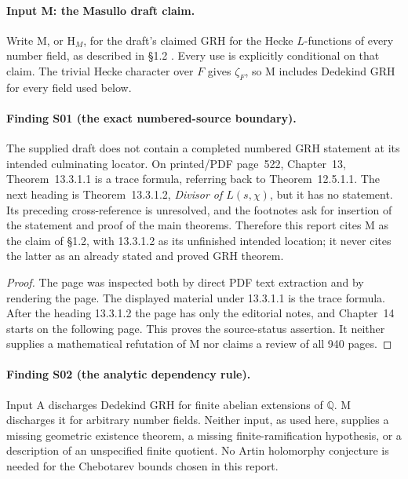 \documentclass[11pt,a4paper]{article}
\begin{document}
\paragraph{Input M: the Masullo draft claim.}
Write M, or $\mathrm H_M$, for the draft's claimed GRH for the Hecke
$L$-functions of every number field, as described in \S1.2
\cite{Masullo}. Every use is explicitly conditional on that claim.
The trivial Hecke character over $F$ gives $\zeta_F$, so M includes
Dedekind GRH for every field used below.

\paragraph{Finding S01 (the exact numbered-source boundary).}
The supplied draft does not contain a completed numbered GRH
statement at its intended culminating locator. On printed/PDF
page~522, Chapter~13, Theorem~13.3.1.1 is a trace formula, referring
back to Theorem~12.5.1.1. The next heading is
Theorem~13.3.1.2, \emph{Divisor of $L(s,\chi)$}, but it has no
statement. Its preceding cross-reference is unresolved, and the
footnotes ask for insertion of the statement and proof of the main
theorems. Therefore this report cites M as the claim of \S1.2, with
13.3.1.2 as its unfinished intended location; it never cites the
latter as an already stated and proved GRH theorem.

\begin{proof}
The page was inspected both by direct PDF text extraction and by
rendering the page. The displayed material under 13.3.1.1 is the
trace formula. After the heading 13.3.1.2 the page has only the
editorial notes, and Chapter~14 starts on the following page.
This proves the source-status assertion. It neither supplies a
mathematical refutation of M nor claims a review of all 940 pages.
\end{proof}

\paragraph{Finding S02 (the analytic dependency rule).}
Input A discharges Dedekind GRH for finite abelian extensions of
$\mathbb Q$. M discharges it for arbitrary number fields. Neither
input, as used here, supplies a missing geometric existence theorem,
a missing finite-ramification hypothesis, or a description of an
unspecified finite quotient. No Artin holomorphy conjecture is needed
for the Chebotarev bounds chosen in this report.
\end{document}
